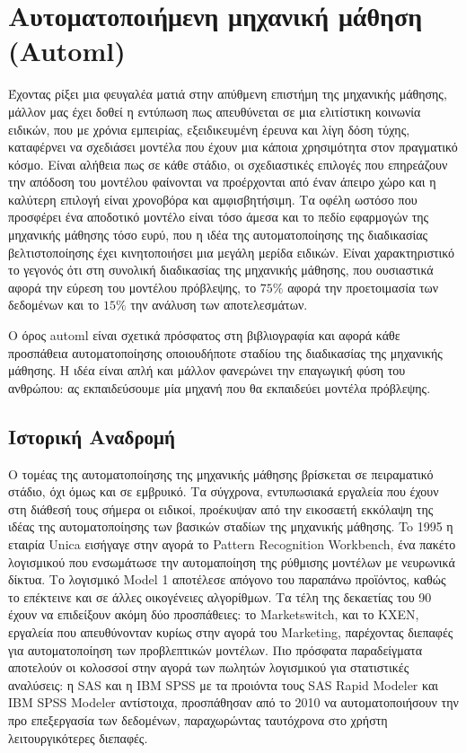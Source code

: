 \documentclass{article}
\begin{document}
 \section{Αυτοματοποιήμενη μηχανική μάθηση (Automl)}
 Έχοντας ρίξει μια φευγαλέα ματιά στην απύθμενη επιστήμη της μηχανικής μάθησης, μάλλον μας έχει δοθεί η εντύπωση πως απευθύνεται σε μια ελιτίστικη κοινωνία ειδικών, που με χρόνια εμπειρίας, εξειδικευμένη έρευνα και λίγη δόση τύχης, καταφέρνει να σχεδιάσει μοντέλα που έχουν μια κάποια χρησιμότητα στον
πραγματικό κόσμο. Είναι αλήθεια πως σε κάθε στάδιο, οι σχεδιαστικές επιλογές που επηρεάζουν την απόδοση του μοντέλου φαίνονται να προέρχονται από έναν άπειρο χώρο και η καλύτερη επιλογή είναι χρονοβόρα και αμφισβητήσιμη. Τα οφέλη ωστόσο που προσφέρει ένα αποδοτικό μοντέλο είναι τόσο άμεσα και το πεδίο εφαρμογών της μηχανικής μάθησης τόσο ευρύ, που η ιδέα της αυτοματοποίησης της διαδικασίας βελτιστοποίησης έχει κινητοποιήσει μια μεγάλη μερίδα ειδικών. Είναι χαρακτηριστικό
το γεγονός ότι στη συνολική διαδικασίας της μηχανικής μάθησης, που ουσιαστικά αφορά την εύρεση του μοντέλου πρόβλεψης, το $75\%$ αφορά την προετοιμασία των δεδομένων και το $15\%$ την ανάλυση των αποτελεσμάτων.

Ο όρος automl είναι σχετικά πρόσφατος στη βιβλιογραφία και αφορά κάθε προσπάθεια
αυτοματοποίησης οποιουδήποτε σταδίου της διαδικασίας της μηχανικής μάθησης. Η ιδέα είναι απλή και μάλλον φανερώνει την επαγωγική φύση του ανθρώπου: ας εκπαιδεύσουμε μία μηχανή που θα εκπαιδεύει μοντέλα πρόβλεψης.
\subsection{Ιστορική Αναδρομή}
Ο τομέας της αυτοματοποίησης της μηχανικής μάθησης βρίσκεται σε πειραματικό στάδιο, όχι όμως και σε εμβρυικό. Τα σύγχρονα, εντυπωσιακά εργαλεία που έχουν στη διάθεσή τους σήμερα οι ειδικοί, προέκυψαν από την εικοσαετή εκκόλαψη της ιδέας της αυτοματοποίησης των βασικών σταδίων της μηχανικής μάθησης. To 1995 η εταιρία Unica εισήγαγε στην αγορά το Pattern Recognition Workbench, ένα πακέτο λογισμικού
που ενσωμάτωσε την αυτομαποίηση της ρύθμισης μοντέλων με νευρωνικά δίκτυα. Το λογισμικό Model 1 αποτέλεσε απόγονο του παραπάνω προϊόντος, καθώς το επέκτεινε και σε άλλες οικογένειες αλγορίθμων. Τα τέλη της δεκαετίας του 90 έχουν να επιδείξουν ακόμη δύο προσπάθειες: το Marketswitch, και το KXEN, εργαλεία που απευθύνονταν κυρίως στην αγορά του Marketing, παρέχοντας διεπαφές για αυτοματοποίηση των προβλεπτικών μοντέλων. Πιο πρόσφατα παραδείγματα αποτελούν οι κολοσσοί στην αγορά των πωλητών λογισμικού για στατιστικές αναλύσεις: η SAS και η IBM SPSS με τα προιόντα τους SAS Rapid Modeler και IBM SPSS Modeler αντίστοιχα, προσπάθησαν από το 2010 να αυτοματοποιήσουν την προ επεξεργασία των δεδομένων, παραχωρώντας ταυτόχρονα στο χρήστη λειτουργικότερες διεπαφές.
\end{document}
